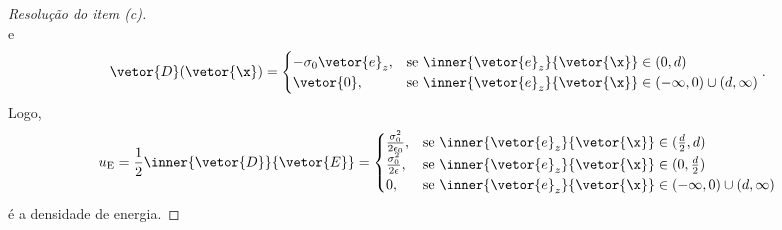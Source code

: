 \begin{proof}[Resolução do item (c)]
\begin{equation*}
    \end{equation*}
    e
    \begin{equation*}
        \vetor{D}(\vetor{\x}) = \begin{cases}
            - \sigma_0\vetor{e}_z,&\text{se }\inner{\vetor{e}_z}{\vetor{\x}} \in (0,d)\\
            \vetor{0}, &\text{se }\inner{\vetor{e}_z}{\vetor{\x}} \in (-\infty, 0) \cup (d, \infty)
        \end{cases}.
    \end{equation*}
    Logo,
    \begin{equation*}
        u_\mathrm{E} = \frac12 \inner{\vetor{D}}{\vetor{E}} = \begin{cases}
            \frac{\sigma_0^2}{2\epsilon_0},&\text{se }\inner{\vetor{e}_z}{\vetor{\x}} \in (\frac{d}{2},d)\\
            \frac{\sigma_0^2}{2\epsilon},&\text{se }\inner{\vetor{e}_z}{\vetor{\x}} \in (0,\frac{d}{2})\\
            0, &\text{se }\inner{\vetor{e}_z}{\vetor{\x}} \in (-\infty,0)\cup (d, \infty)
        \end{cases}
    \end{equation*}
    é a densidade de energia.

\end{proof}
